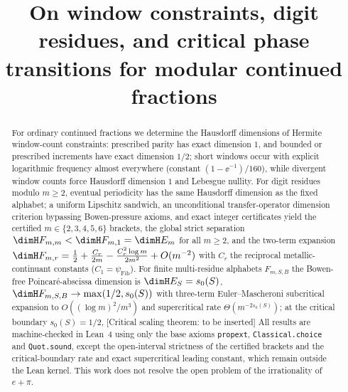 \title{On window constraints, digit residues, and critical phase transitions
for modular continued fractions}


\maketitle

\begin{abstract}
For ordinary continued fractions we determine the Hausdorff dimensions of
Hermite window-count constraints: prescribed parity has exact dimension $1$,
and bounded or prescribed increments have exact dimension $1/2$; short windows
occur with explicit logarithmic frequency almost everywhere (constant
$(1-\ee^{-1})/160$), while divergent window counts force Hausdorff dimension
$1$ and Lebesgue nullity. For digit residues modulo $m\ge2$, eventual
periodicity has the same Hausdorff dimension as the fixed alphabet; a
uniform Lipschitz sandwich, an unconditional transfer-operator
dimension criterion bypassing Bowen-pressure axioms, and exact
integer certificates yield the certified $m\in\{2,3,4,5,6\}$ brackets, the
global strict separation $\dimH F_{m,m}<\dimH F_{m,1}=\dimH E_m$ for all
$m\ge2$, and the two-term expansion
$\dimH F_{m,r}=\frac12+\frac{C_r}{2m}-\frac{C_r^2\log m}{2m^2}+O(m^{-2})$
with $C_r$ the reciprocal metallic-continuant constants
($C_1=\psi_{\mathrm{Fib}}$). For finite multi-residue alphabets $F_{m,S,B}$
the Bowen-free Poincar\'e-abscissa dimension is $\dimH E_S=s_0(S)$,
$\dimH F_{m,S,B}\to\max(1/2,s_0(S))$ with three-term Euler--Mascheroni
subcritical expansion to $O((\log m)^2/m^3)$ and supercritical rate
$\Theta(m^{-2s_0(S)})$; at the critical boundary $s_0(S)=1/2$, [Critical scaling theorem: to be inserted]
All results are machine-checked in Lean~4 using only the base axioms
\texttt{propext}, \texttt{Classical.choice} and \texttt{Quot.sound}, except
the open-interval strictness of the certified brackets and the
critical-boundary rate and exact supercritical leading constant, which remain
outside the Lean kernel.
This work does not resolve the open problem of the irrationality of $e+\pi$.
\end{abstract}

